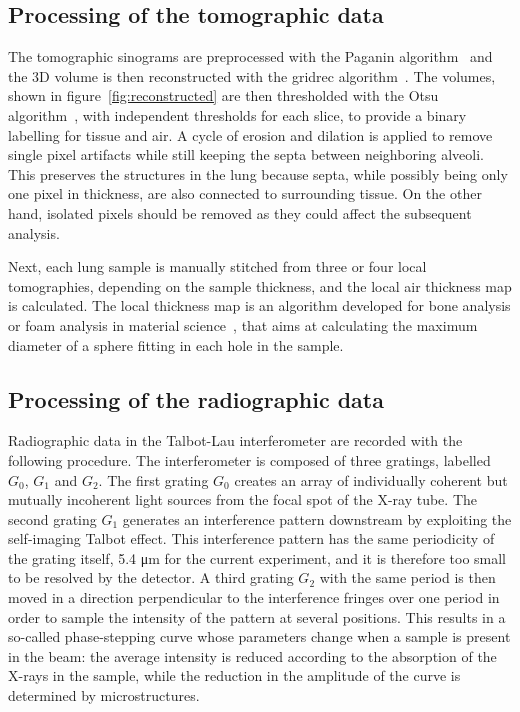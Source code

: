 
\subsection{Processing of the tomographic data}\label{sec:tomoprocessing}
The tomographic sinograms are preprocessed with the Paganin
algorithm~\cite{Paganin_2002a} and
the 3D volume is then reconstructed with the gridrec
algorithm~\cite{Marone_2012}. The volumes, shown in
figure~\ref{fig:reconstructed} are then thresholded with the Otsu
algorithm~\cite{Otsu_1979}, with independent thresholds for each slice, to
provide a binary labelling for tissue and air. A cycle of
erosion and dilation is applied to remove single pixel artifacts while still
keeping the septa between neighboring alveoli.
This preserves the structures in the lung because septa, while possibly
being only one pixel in thickness, are also connected to surrounding tissue.
On the other hand, isolated pixels should be removed as they could affect
the subsequent analysis.

Next, each lung sample is manually stitched from three or four local
tomographies, depending on the sample thickness, and the local air thickness
map is calculated. The local thickness map is an algorithm developed for
bone analysis or foam analysis in material science~\cite{Hildebrand_2003}, that aims
at calculating the maximum diameter of a sphere fitting in each hole in the
sample.

\subsection{Processing of the radiographic data}\label{sec:radioprocessing}
Radiographic data in the Talbot-Lau interferometer are recorded with the
following procedure. The interferometer is composed of three gratings,
labelled $G_0$, $G_1$ and $G_2$. The first grating $G_0$ creates an array of
individually coherent but mutually incoherent light sources from the
focal spot of the X-ray tube. The second grating $G_1$ generates an
interference pattern downstream by exploiting the self-imaging Talbot
effect. This interference pattern has the same periodicity of the grating
itself, 5.4 μm for the current experiment, and it is therefore too small to
be resolved by the detector. A third grating $G_2$ with the same period is
then moved in a direction perpendicular to the interference fringes over one
period in order to sample the intensity of the pattern at several positions.
This results in a so-called phase-stepping curve whose parameters change
when a sample is present in the beam: the average intensity is reduced
according to the absorption of the X-rays in the sample, while the reduction
in the amplitude of the curve is determined by microstructures.

